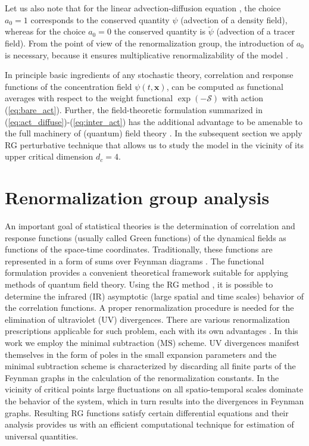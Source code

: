 \documentclass[aps,pre,url,twocolumn,superscriptaddress]{revtex4-1}
\def\S{\mathcal{S}}
\def\mx{{\bm x}}
\begin{document}
Let us also note that for the linear advection-diffusion equation \cite{Ant00,Landau_fluid}, the
choice $a_0=1$ corresponds to the conserved quantity $\psi$ (advection of a
density field), whereas for the choice $a_0=0$ the conserved
quantity is $\tilde{\psi}$ (advection of a tracer field).
From the point of view of the renormalization 
group, the introduction of $a_0$ is necessary,
because it ensures multiplicative renormalizability of the model \cite{AntKap10}.


In principle basic ingredients of any stochastic theory, correlation and 
response functions of the concentration 
field $\psi(t,\mx)$, can  be
computed as functional averages with respect to the weight functional $\exp(-\S)$
with action (\ref{eq:bare_act}).
Further, the field-theoretic formulation summarized in (\ref{eq:act_diffuse})-(\ref{eq:inter_act})
 has the additional advantage to be amenable to the full machinery of (quantum) field theory
 \cite{Zinn,Vasiliev}.
In the subsequent section we apply RG perturbative technique \cite{Vasiliev} that allows us
to study the model in the vicinity of its upper critical dimension $d_c=4$.
\section{Renormalization group analysis \label{sec:RG_analysis}}
%
%
%

An important goal of statistical theories is the determination of correlation and response functions
(usually called Green functions) of the dynamical fields as functions of the space-time coordinates. 
Traditionally, these functions are represented in a form of sums over Feynman diagrams 
\cite{Vasiliev,Zinn}.
The functional formulation provides a convenient theoretical framework
suitable for applying methods of quantum field theory.
Using the RG method \cite{WilKog74,Zinn}, it is possible to determine the infrared (IR)
asymptotic (large spatial and time scales) behavior of the correlation 
functions. A proper renormalization procedure is needed for the elimination of 
ultraviolet (UV) divergences.
There are various renormalization prescriptions applicable for such 
 problem, each with its own
advantages \cite{Zinn}. In this work we employ the
 minimal subtraction (${\text{MS}}$) scheme. 
UV divergences manifest themselves
in the form of poles in the small expansion parameters and the minimal subtraction scheme
is characterized by discarding all finite parts of the Feynman graphs in the
calculation of the renormalization constants.
In the vicinity of critical points large fluctuations on all spatio-temporal scales dominate
the behavior of the system, which in turn results into the divergences in Feynman graphs.
Resulting RG functions satisfy certain differential equations and their analysis
 provides us with an efficient computational technique for estimation of universal quantities.
\end{document}
